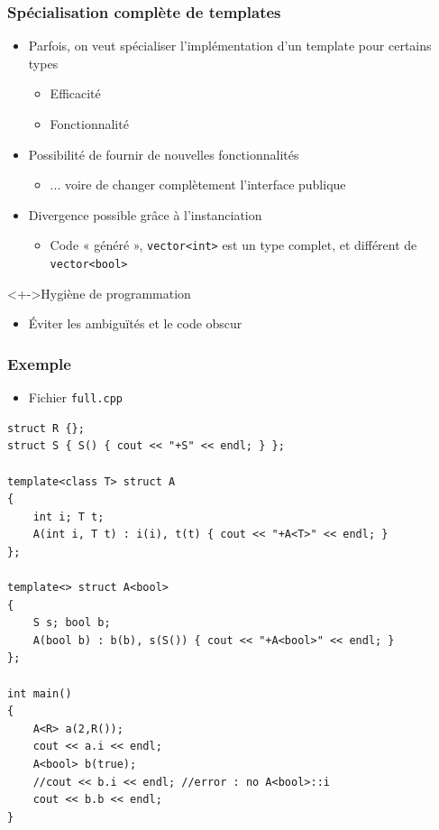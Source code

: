 
\begin{frame}
\frametitle{Spécialisation complète de templates}
\begin{itemize}[<+->]
\item Parfois, on veut spécialiser l'implémentation d'un template pour certains types
	\begin{itemize}
	\item Efficacité
	\item Fonctionnalité
	\end{itemize}
\item Possibilité de fournir de nouvelles fonctionnalités
	\begin{itemize}
	\item ... voire de changer complètement l'interface publique
	\end{itemize}
\item Divergence possible grâce à l'instanciation
	\begin{itemize}
	\item Code « généré », \lstinline|vector<int>| est un type complet, et différent de \lstinline|vector<bool>|
	\end{itemize}
\end{itemize}
\begin{block}<+->{Hygiène de programmation}
	\begin{itemize}
	\item Éviter les ambiguïtés et le code obscur
	\end{itemize}
\end{block}
\end{frame}

\begin{frame}[containsverbatim]
\frametitle{Exemple}
\begin{itemize}
\item Fichier \texttt{full.cpp}
\end{itemize}
\begin{lstlisting}
struct R {};
struct S { S() { cout << "+S" << endl; } };

template<class T> struct A
{
	int i; T t;
	A(int i, T t) : i(i), t(t) { cout << "+A<T>" << endl; }			
};

template<> struct A<bool>
{
	S s; bool b;
	A(bool b) : b(b), s(S()) { cout << "+A<bool>" << endl; }
};

int main()
{
	A<R> a(2,R());
	cout << a.i << endl;	
	A<bool> b(true);
	//cout << b.i << endl; //error : no A<bool>::i
	cout << b.b << endl;
}
\end{lstlisting}
\end{frame}

